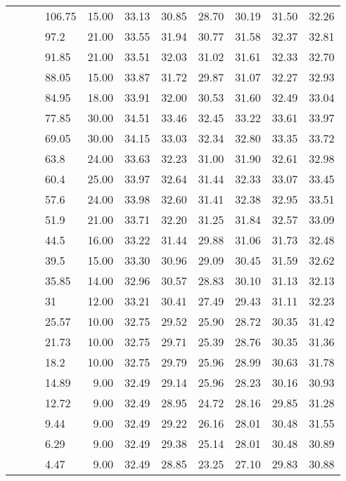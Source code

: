 \begin{longtable}{llllrrrrrrr}
   &  &  & 106.75 & 15.00 & 33.13 & 30.85 & 28.70 & 30.19 & 31.50 & 32.26 \\ 
   &  &  & 97.2 & 21.00 & 33.55 & 31.94 & 30.77 & 31.58 & 32.37 & 32.81 \\ 
   &  &  & 91.85 & 21.00 & 33.51 & 32.03 & 31.02 & 31.61 & 32.33 & 32.70 \\ 
   &  &  & 88.05 & 15.00 & 33.87 & 31.72 & 29.87 & 31.07 & 32.27 & 32.93 \\ 
   &  &  & 84.95 & 18.00 & 33.91 & 32.00 & 30.53 & 31.60 & 32.49 & 33.04 \\ 
   &  &  & 77.85 & 30.00 & 34.51 & 33.46 & 32.45 & 33.22 & 33.61 & 33.97 \\ 
   &  &  & 69.05 & 30.00 & 34.15 & 33.03 & 32.34 & 32.80 & 33.35 & 33.72 \\ 
   &  &  & 63.8 & 24.00 & 33.63 & 32.23 & 31.00 & 31.90 & 32.61 & 32.98 \\ 
   &  &  & 60.4 & 25.00 & 33.97 & 32.64 & 31.44 & 32.33 & 33.07 & 33.45 \\ 
   &  &  & 57.6 & 24.00 & 33.98 & 32.60 & 31.41 & 32.38 & 32.95 & 33.51 \\ 
   &  &  & 51.9 & 21.00 & 33.71 & 32.20 & 31.25 & 31.84 & 32.57 & 33.09 \\ 
   &  &  & 44.5 & 16.00 & 33.22 & 31.44 & 29.88 & 31.06 & 31.73 & 32.48 \\ 
   &  &  & 39.5 & 15.00 & 33.30 & 30.96 & 29.09 & 30.45 & 31.59 & 32.62 \\ 
   &  &  & 35.85 & 14.00 & 32.96 & 30.57 & 28.83 & 30.10 & 31.13 & 32.13 \\ 
   &  &  & 31 & 12.00 & 33.21 & 30.41 & 27.49 & 29.43 & 31.11 & 32.23 \\ 
   &  &  & 25.57 & 10.00 & 32.75 & 29.52 & 25.90 & 28.72 & 30.35 & 31.42 \\ 
   &  &  & 21.73 & 10.00 & 32.75 & 29.71 & 25.39 & 28.76 & 30.35 & 31.36 \\ 
   &  &  & 18.2 & 10.00 & 32.75 & 29.79 & 25.96 & 28.99 & 30.63 & 31.78 \\ 
   &  &  & 14.89 & 9.00 & 32.49 & 29.14 & 25.96 & 28.23 & 30.16 & 30.93 \\ 
   &  &  & 12.72 & 9.00 & 32.49 & 28.95 & 24.72 & 28.16 & 29.85 & 31.28 \\ 
   &  &  & 9.44 & 9.00 & 32.49 & 29.22 & 26.16 & 28.01 & 30.48 & 31.55 \\ 
   &  &  & 6.29 & 9.00 & 32.49 & 29.38 & 25.14 & 28.01 & 30.48 & 30.89 \\ 
   &  &  & 4.47 & 9.00 & 32.49 & 28.85 & 23.25 & 27.10 & 29.83 & 30.88 \\ 

\end{longtable}
